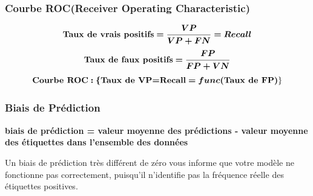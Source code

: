 \documentclass[french]{article}
\begin{document}
	\subsubsection{Courbe ROC(Receiver Operating Characteristic)}
	$$\bm{\text{\textbf{Taux de vrais positifs}}=\frac{VP}{VP+FN}=Recall}$$
	$$\bm{\text{\textbf{Taux de faux positifs}}=\frac{FP}{FP+VN}}$$
	$$\bm{\text{\textbf{Courbe ROC}}:\{\text{\textbf{Taux de VP=Recall}}=func(\text{\textbf{Taux de FP}})}\}$$
	
	\subsubsection{Biais de Prédiction}
	\begin{center}
		\textbf{biais de prédiction = valeur moyenne des prédictions - valeur moyenne des étiquettes dans l'ensemble des données}
	\end{center}
Un biais de prédiction très différent de zéro vous informe que votre modèle ne fonctionne pas correctement, puisqu'il n'identifie pas la fréquence réelle des étiquettes positives.\\
\end{document}
